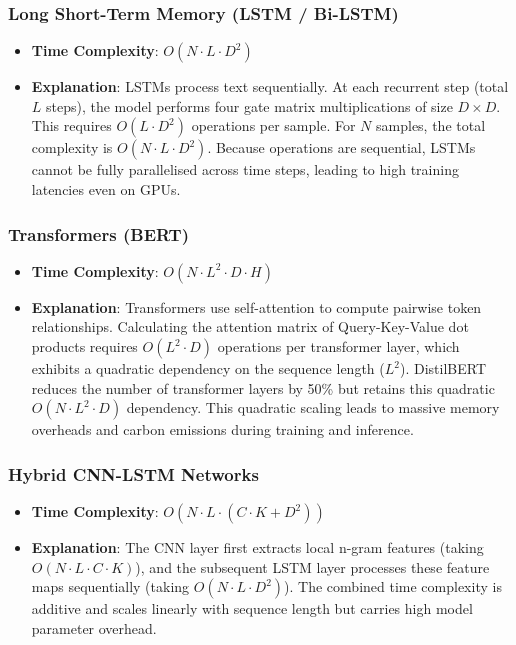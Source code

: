 \documentclass[11pt]{article}
\begin{document}
\subsubsection{Long Short-Term Memory (LSTM / Bi-LSTM)}
\begin{itemize}
    \item \textbf{Time Complexity}: $O(N \cdot L \cdot D^2)$
    \item \textbf{Explanation}: LSTMs process text sequentially. At each recurrent step (total $L$ steps), the model performs four gate matrix multiplications of size $D \times D$. This requires $O(L \cdot D^2)$ operations per sample. For $N$ samples, the total complexity is $O(N \cdot L \cdot D^2)$. Because operations are sequential, LSTMs cannot be fully parallelised across time steps, leading to high training latencies even on GPUs.
\end{itemize}

\subsubsection{Transformers (BERT)}
\begin{itemize}
    \item \textbf{Time Complexity}: $O(N \cdot L^2 \cdot D \cdot H)$
    \item \textbf{Explanation}: Transformers use self-attention to compute pairwise token relationships. Calculating the attention matrix of Query-Key-Value dot products requires $O(L^2 \cdot D)$ operations per transformer layer, which exhibits a quadratic dependency on the sequence length ($L^2$). DistilBERT reduces the number of transformer layers by 50\% but retains this quadratic $O(N \cdot L^2 \cdot D)$ dependency. This quadratic scaling leads to massive memory overheads and carbon emissions during training and inference.
\end{itemize}

\subsubsection{Hybrid CNN-LSTM Networks}
\begin{itemize}
    \item \textbf{Time Complexity}: $O(N \cdot L \cdot (C \cdot K + D^2))$
    \item \textbf{Explanation}: The CNN layer first extracts local n-gram features (taking $O(N \cdot L \cdot C \cdot K)$), and the subsequent LSTM layer processes these feature maps sequentially (taking $O(N \cdot L \cdot D^2)$). The combined time complexity is additive and scales linearly with sequence length but carries high model parameter overhead.
\end{itemize}
\end{document}
